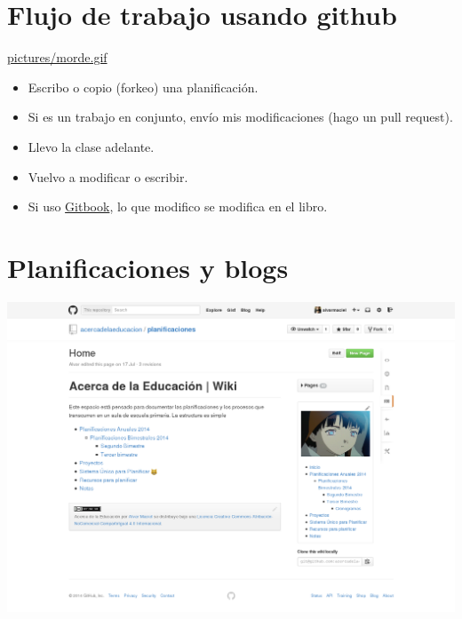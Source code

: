 \documentclass[11pt]{article}
\begin{document}
\section{Flujo de trabajo usando github}
\label{sec:orgheadline8}
\url{pictures/morde.gif}

\begin{itemize}
\item Escribo o copio (forkeo) una planificación.
\item Si es un trabajo en conjunto, envío mis modificaciones (hago un pull request).
\item Llevo la clase adelante.
\item Vuelvo a modificar o escribir.
\item Si uso \href{https://gitbook.io}{Gitbook}, lo que modifico se modifica en el libro.
\end{itemize}

\section{Planificaciones y blogs}
\label{sec:orgheadline9}
\includegraphics[width=.9\linewidth]{pictures/plani1.png}
\end{document}
